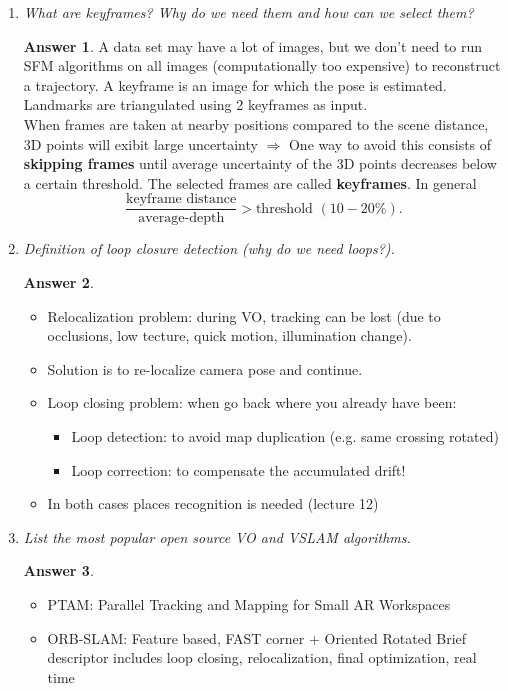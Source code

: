 \documentclass[a4paper,12 pt]{article}
\theoremstyle{definition}
\theoremstyle{remark}
\theoremstyle{definition}
\theoremstyle{definition}
\theoremstyle{definition}
\theoremstyle{definition}
\theoremstyle{remark}
\theoremstyle{remark}
\theoremstyle{definition}
\theoremstyle{definition}
\newtheorem*{answer}{Answer}
\begin{document}
\begin{enumerate}
\item \textit{ What are keyframes? Why do we need them and how can we select them? }
\begin{answer}
A data set may have a lot of images, but we don't need to run SFM algorithms on all images (computationally too expensive) to reconstruct a trajectory. A keyframe is an image for which the pose is estimated. Landmarks are triangulated using 2 keyframes as input. \\
When frames are taken at nearby positions compared to the scene distance, 3D points will exibit large uncertainty $\Rightarrow$ One way to avoid this consists of \textbf{skipping frames} until average uncertainty of the 3D points decreases below a certain threshold. The selected frames are called \textbf{keyframes}. In general
\begin{equation}
\frac{\text{keyframe distance}}{\text{average-depth}}>\text{threshold }(10-20\%).
\end{equation}
\end{answer}
\item \textit{Definition of loop closure detection (why do we need loops?). }
\begin{answer}
\
\begin{itemize}
\item Relocalization problem: during VO, tracking can be lost (due to occlusions, low tecture, quick motion, illumination change).
\item Solution is to re-localize camera pose and continue.
\item Loop closing problem: when go back where you already have been:
\begin{itemize}
\item Loop detection: to avoid map duplication (e.g. same crossing rotated)
\item Loop correction: to compensate the accumulated drift!
\end{itemize}
\item In both cases places recognition is needed (lecture 12)
\end{itemize}
\end{answer}
\item \textit{List the most popular open source VO and VSLAM algorithms. }
\begin{answer}
\
\begin{itemize}
\item PTAM: Parallel Tracking and Mapping for Small AR Workspaces
\item ORB-SLAM: Feature based, FAST corner + Oriented Rotated Brief descriptor includes loop closing, relocalization, final optimization, real time

\end{itemize}
\end{answer}
\end{enumerate}
\end{document}
